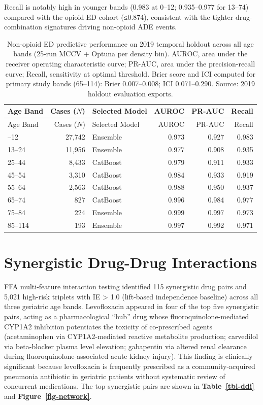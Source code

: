 \documentclass[
  12pt,
]{book}
\begin{document}
Recall is notably high in younger bands (0.983 at 0--12; 0.935--0.977
for 13--74) compared with the opioid ED cohort (≤0.874), consistent with
the tighter drug-combination signatures driving non-opioid ADE events.

\begin{longtable}[]{@{}lrlrrr@{}}
\caption{Non-opioid ED predictive performance on 2019 temporal holdout
across all age bands (25-run MCCV + Optuna per density bin). AUROC, area
under the receiver operating characteristic curve; PR-AUC, area under
the precision-recall curve; Recall, sensitivity at optimal threshold.
Brier score and ICI computed for primary study bands (65--114): Brier
0.007--0.008; ICI 0.071--0.290. Source: 2019 holdout evaluation
exports.}\label{tbl-ch4-perf}\tabularnewline
\toprule\noalign{}
Age Band & Cases (\(N\)) & Selected Model & AUROC & PR-AUC & Recall \\
\midrule\noalign{}
\endfirsthead
\toprule\noalign{}
Age Band & Cases (\(N\)) & Selected Model & AUROC & PR-AUC & Recall \\
\midrule\noalign{}
\endhead
\bottomrule\noalign{}
\endlastfoot
0--12 & 27,742 & Ensemble & 0.973 & 0.927 & 0.983 \\
13--24 & 11,956 & Ensemble & 0.977 & 0.908 & 0.935 \\
25--44 & 8,433 & CatBoost & 0.979 & 0.911 & 0.933 \\
45--54 & 3,310 & CatBoost & 0.984 & 0.933 & 0.919 \\
55--64 & 2,563 & CatBoost & 0.988 & 0.950 & 0.937 \\
65--74 & 827 & CatBoost & 0.996 & 0.984 & 0.977 \\
75--84 & 224 & Ensemble & 0.999 & 0.997 & 0.973 \\
85--114 & 193 & Ensemble & 0.997 & 0.992 & 0.971 \\
\end{longtable}

\section{Synergistic Drug-Drug Interactions}\label{sec-ddi}

FFA multi-feature interaction testing identified 115 synergistic drug
pairs and 5,021 high-risk triplets with IE \textgreater{} 1.0
(lift-based independence baseline) across all three geriatric age bands.
Levofloxacin appeared in four of the top five synergistic pairs, acting
as a pharmacological ``hub'' drug whose fluoroquinolone-mediated CYP1A2
inhibition potentiates the toxicity of co-prescribed agents
(acetaminophen via CYP1A2-mediated reactive metabolite production;
carvedilol via beta-blocker plasma level elevation; gabapentin via
altered renal clearance during fluoroquinolone-associated acute kidney
injury). This finding is clinically significant because levofloxacin is
frequently prescribed as a community-acquired pneumonia antibiotic in
geriatric patients without systematic review of concurrent medications.
The top synergistic pairs are shown in \textbf{Table~\ref{tbl-ddi}} and
\textbf{Figure~\ref{fig-network}}.
\end{document}
